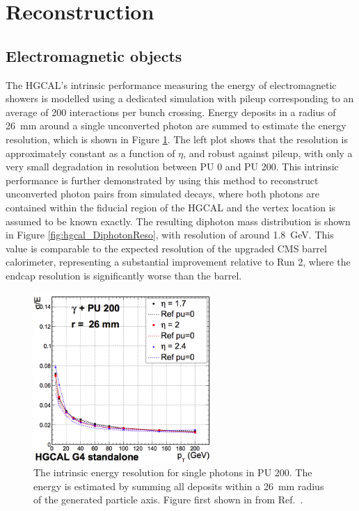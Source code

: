 \section{Reconstruction}

\subsection{Electromagnetic objects}

The HGCAL's intrinsic performance measuring the energy of electromagnetic showers 
is modelled using a dedicated simulation 
with pileup corresponding to an average of 200 interactions per bunch crossing. %
Energy deposits in a radius of \SI{26}{mm} around a single unconverted photon 
are summed to estimate the energy resolution, 
which is shown in Figure \ref{fig:hgcal_PhotonReso}. %
The left plot shows that the resolution is approximately constant as a function of $\eta$, 
and robust against pileup, with only a very small degradation in resolution between PU 0 and PU 200. %
This intrinsic performance is further demonstrated 
by using this method to reconstruct unconverted photon pairs from simulated \Hgg decays, 
where both photons are contained within the fiducial region of the HGCAL 
and the vertex location is assumed to be known exactly. 
The resulting diphoton mass distribution is shown in Figure \ref{fig:hgcal_DiphotonReso}, 
with resolution of around \SI{1.8}{GeV}.
This value is comparable to the expected resolution of the upgraded CMS barrel calorimeter, 
representing a substantial improvement relative to Run 2, 
where the endcap resolution is significantly worse than the barrel. %

\begin{figure}[h!]
  \centering
  \includegraphics[width=0.6\textwidth]{Figures/HGCAL/SinglePhotonReso.png}
  \caption[HGCAL photon energy resolution.]
  {
    The intrinsic energy resolution for single photons in PU 200. 
    The energy is estimated by summing all deposits within a \SI{26}{mm} radius 
    of the generated particle axis. 
    Figure first shown in from Ref.~\cite{HGCAL}.
  }
  \label{fig:hgcal_PhotonReso}
\end{figure}

